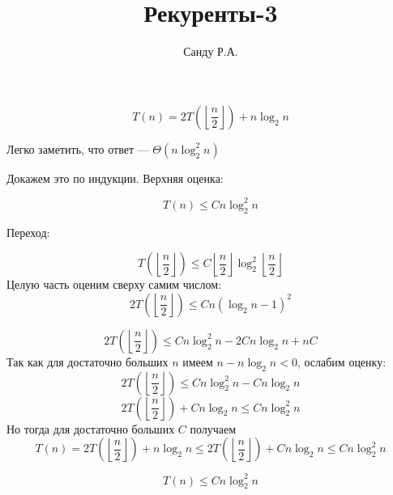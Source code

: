 \documentclass[11pt]{article}
\title{Рекуренты-3}
\author{Санду Р.А.}
\begin{document}
\maketitle

\begin{equation}
	T\left(n\right)=2T\left(\left\lfloor\frac{n}{2}\right\rfloor\right)+n\log_2{n}
\end{equation}

Легко заметить, что ответ — $\Theta\left(n\log^2_2{n}\right)$

Докажем это по индукции. Верхняя оценка:

\begin{equation}
	T\left(n\right) \leq Cn\log^2_2{n}
\end{equation}

Переход:

\begin{equation}
	T\left(\left\lfloor\frac{n}{2}\right\rfloor\right) 
	\leq 
	C\left\lfloor\frac{n}{2}\right\rfloor \log^2_2{\left\lfloor\frac{n}{2}\right\rfloor}
\end{equation}
Целую часть оценим сверху самим числом:
\begin{equation}
	2T\left(\left\lfloor\frac{n}{2}\right\rfloor\right) 
	\leq 
	C n\left(\log_2{n}-1\right)^2
\end{equation}

\begin{equation}
	2T\left(\left\lfloor\frac{n}{2}\right\rfloor\right) 
	\leq 
	Cn\log^2_2{n} - 2Cn\log_2{n} + nC
\end{equation}
Так как для достаточно больших $n$ имеем $n - n\log_2{n} < 0$, ослабим оценку:
\begin{equation}
	2T\left(\left\lfloor\frac{n}{2}\right\rfloor\right) 
	\leq 
	Cn\log^2_2{n} - Cn\log_2{n}
\end{equation}
\begin{equation}
	2T\left(\left\lfloor\frac{n}{2}\right\rfloor\right) + Cn\log_2{n}
	\leq 
	Cn\log^2_2{n}
\end{equation}
Но тогда для достаточно больших $C$ получаем
\begin{equation}
	T\left(n\right)
	=
	2T\left(\left\lfloor\frac{n}{2}\right\rfloor\right) + n\log_2{n}
	\leq
	2T\left(\left\lfloor\frac{n}{2}\right\rfloor\right) + Cn\log_2{n} 
	\leq 
	Cn\log^2_2{n}
\end{equation}

\begin{equation}
	T\left(n\right)
	\leq 
	Cn\log^2_2{n}
\end{equation}
\end{document}
